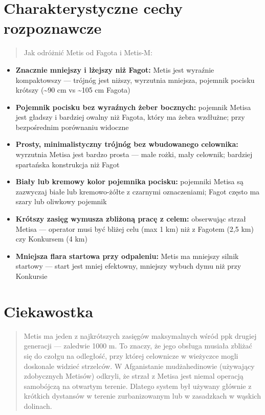 \documentclass[12pt,openany,oneside]{book}
\providecommand{\tightlist}{%
  \setlength{\itemsep}{0pt}\setlength{\parskip}{0pt}}
\begin{document}
\section{Charakterystyczne cechy
rozpoznawcze}\label{charakterystyczne-cechy-rozpoznawcze-36}

\begin{quote}
Jak odróżnić Metis od Fagota i Metis-M:
\end{quote}

\begin{itemize}
\tightlist
\item
  \textbf{Znacznie mniejszy i lżejszy niż Fagot:} Metis jest wyraźnie
  kompaktowszy --- trójnóg jest niższy, wyrzutnia mniejsza, pojemnik
  pocisku krótszy (\textasciitilde90 cm vs \textasciitilde105 cm Fagota)
\item
  \textbf{Pojemnik pocisku bez wyraźnych żeber bocznych:} pojemnik
  Metisa jest gładszy i bardziej owalny niż Fagota, który ma żebra
  wzdłużne; przy bezpośrednim porównaniu widoczne
\item
  \textbf{Prosty, minimalistyczny trójnóg bez wbudowanego celownika:}
  wyrzutnia Metisa jest bardzo prosta --- małe rożki, mały celownik;
  bardziej spartańska konstrukcja niż Fagot
\item
  \textbf{Biały lub kremowy kolor pojemnika pocisku:} pojemniki Metisa
  są zazwyczaj białe lub kremowo-żółte z czarnymi oznaczeniami; Fagot
  często ma szary lub oliwkowy pojemnik
\item
  \textbf{Krótszy zasięg wymusza zbliżoną pracę z celem:} obserwując
  strzał Metisa --- operator musi być bliżej celu (max 1 km) niż z
  Fagotem (2,5 km) czy Konkursem (4 km)
\item
  \textbf{Mniejsza flara startowa przy odpaleniu:} Metis ma mniejszy
  silnik startowy --- start jest mniej efektowny, mniejszy wybuch dymu
  niż przy Konkursie
\end{itemize}

\section{Ciekawostka}\label{ciekawostka-36}

\begin{quote}
Metis ma jeden z najkrótszych zasięgów maksymalnych wśród ppk drugiej
generacji --- zaledwie 1000 m. To znaczy, że jego obsługa musiała
zbliżać się do czołgu na odległość, przy której celownicze w wieżyczce
mogli doskonale widzieć strzelców. W Afganistanie mudżahedinowie
(używający zdobycznych Metisów) odkryli, że strzał z Metisa jest niemal
operacją samobójczą na otwartym terenie. Dlatego system był używany
głównie z krótkich dystansów w terenie zurbanizowanym lub w zasadzkach w
wąskich dolinach.
\end{quote}
\end{document}

